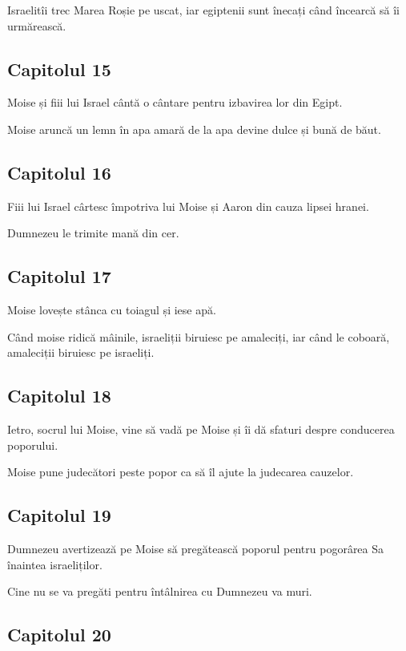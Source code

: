 \documentclass[12pt,a4paper]{article}
\begin{document}
Israelitîi trec Marea Roșie pe uscat, iar egiptenii sunt înecați când încearcă să îi urmărească.

\subsection{Capitolul 15}

Moise și fiii lui Israel cântă o cântare pentru izbavirea lor din Egipt.

Moise aruncă un lemn în apa amară de la apa devine dulce și bună de băut.

\subsection{Capitolul 16}

Fiii lui Israel cârtesc împotriva lui Moise și Aaron din cauza lipsei hranei.

Dumnezeu le trimite mană din cer.

\subsection{Capitolul 17}

Moise lovește stânca cu toiagul și iese apă.

Când moise ridică mâinile, israeliții biruiesc pe amaleciți, iar când le coboară, amaleciții biruiesc pe israeliți.

\subsection{Capitolul 18}

Ietro, socrul lui Moise, vine să vadă pe Moise și îi dă sfaturi despre conducerea poporului.

Moise pune judecători peste popor ca să îl ajute la judecarea cauzelor.

\subsection{Capitolul 19}

Dumnezeu avertizează pe Moise să pregătească poporul pentru pogorârea Sa înaintea israeliților.

Cine nu se va pregăti pentru întâlnirea cu Dumnezeu va muri.

\subsection{Capitolul 20}
\end{document}
